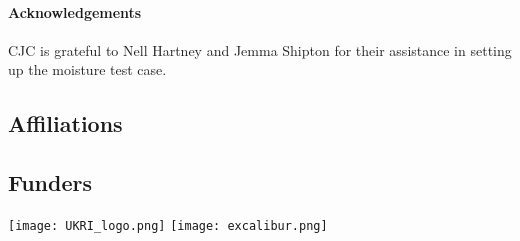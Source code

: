 \documentclass[
]{ImperialPoster}
\begin{document}
\begin{multicols}{3}
\vspace{-10mm}
\paragraph{Acknowledgements} CJC is grateful to Nell Hartney and Jemma Shipton for their assistance in setting up the moisture test case.

\AtNextBibliography{\small} \printbibliography
        
\subsection{Affiliations}

	
\subsection{Funders}

\texttt{[image: UKRI\_logo.png]} %
\texttt{[image: excalibur.png]} %
	

\end{multicols}

\end{document}
